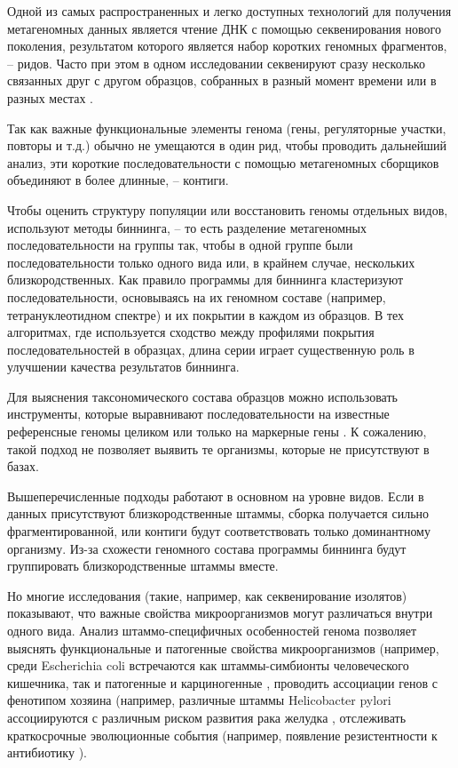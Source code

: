 \documentclass{spbau-diploma}
\begin{document}
Одной из самых распространенных и легко доступных технологий для получения метагеномных данных является чтение ДНК с помощью секвенирования нового поколения, результатом которого является набор коротких геномных фрагментов, \--- ридов. Часто при этом в одном исследовании секвенируют сразу несколько связанных друг с другом образцов, собранных в разный момент времени \cite{time_series} или в разных местах \cite{spacial_series_1, spacial_series_2}.

Так как важные функциональные элементы генома (гены, регуляторные участки, повторы и т.д.) обычно не умещаются в один рид, чтобы проводить дальнейший анализ, эти короткие последовательности с помощью метагеномных сборщиков \cite{IDBA-UD, MEGAHIT, MetaVelvet, RayMeta, MetaSpades} объединяют в более длинные, \--- контиги. 

Чтобы оценить структуру популяции или восстановить геномы отдельных видов, используют методы биннинга, \--- то есть разделение метагеномных последовательности на группы так, чтобы в одной группе были последовательности только одного вида или, в крайнем случае, нескольких близкородственных. Как правило программы для биннинга \cite{CONCOCT, GroopM, MyCC, MetaBAT} кластеризуют последовательности, основываясь на их геномном составе (например, тетрануклеотидном спектре) и их покрытии в каждом из образцов. В тех алгоритмах, где используется сходство между профилями покрытия последовательностей в образцах, длина серии играет существенную роль в улучшении качества результатов биннинга.

Для выяснения таксономического состава образцов можно использовать инструменты, которые выравнивают последовательности на известные референсные геномы целиком \cite{GOTTCHA, CLARK, Kraken} или только на маркерные гены \cite{MetaPhlAn2, mOTU}. К сожалению, такой подход не позволяет выявить те организмы, которые не присутствуют в базах.

Вышеперечисленные подходы работают в основном на уровне видов. Если в данных присутствуют близкородственные штаммы, сборка получается сильно фрагментированной, или контиги будут соответствовать только доминантному организму. Из-за схожести геномного состава программы биннинга будут группировать близкородственные штаммы вместе. 

Но многие исследования (такие, например, как секвенирование изолятов) показывают, что важные свойства микроорганизмов могут различаться внутри одного вида. Анализ штаммо-специфичных особенностей генома позволяет выяснять функциональные и патогенные свойства микроорганизмов (например, среди Escherichia coli встречаются как штаммы-симбионты человеческого кишечника, так и патогенные \cite{patogen_ecoli} и карциногенные \cite{carcinogenic_ecoli}, проводить ассоциации генов с фенотипом хозяина (например, различные штаммы  Helicobacter pylori ассоциируются с различным риском развития  рака желудка \cite{cancer_example}, отслеживать краткосрочные эволюционные события (например, появление резистентности к антибиотику \cite{antibitics_resistance}).
\end{document}
